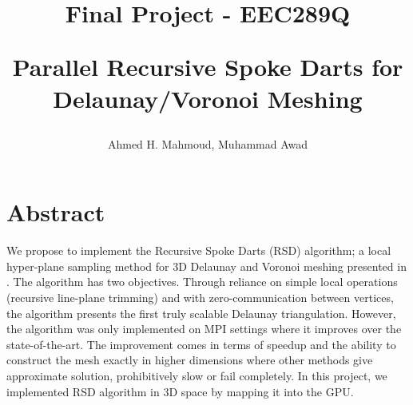 \documentclass[12pt] {article}
\begin{document}

\title{
Final Project -  EEC289Q \\
\begin{large}
Parallel Recursive Spoke Darts for Delaunay/Voronoi Meshing
\end{large}
}
\author{Ahmed H. Mahmoud, Muhammad Awad}
\date{}
\maketitle



\section*{Abstract}
We propose to implement the Recursive Spoke Darts (RSD) algorithm; a local hyper-plane sampling method for 3D Delaunay and Voronoi meshing presented in \citep{EBEIDA2016110}. The algorithm has two objectives. Through reliance on simple local operations (recursive line-plane trimming) and with zero-communication between vertices, the algorithm presents the first truly scalable Delaunay triangulation. However, the algorithm was only implemented on MPI settings where it improves over the state-of-the-art. The improvement comes in terms of speedup and the ability to construct the mesh exactly in higher dimensions where other methods give approximate solution, prohibitively slow or fail completely. In this project, we implemented RSD algorithm in 3D space by mapping it into the GPU. 
\end{document}
